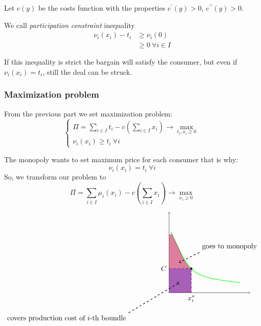 \documentclass[a4paper, 10pt]{article}
\begin{document}
Let $c(y)$ be the costs function with the properties $c^{\prime}(y)>0$, $c^{\prime \prime}(y)>0$.

We call \textit{participation constraint} inequality
$$
\begin{aligned}
    \nu_i\left(x_i\right)-t_i &\geqslant \nu_i(0)\\
    &\geqslant 0\ \forall i \in I
\end{aligned}
$$

If this inequality is strict the bargain will satisfy the consumer, but even if $\nu_i\left(x_i\right)=t_i$, still the deal can be struck.

\subsubsection{Maximization problem}
From the previous part we set maximization problem:
\begin{equation*}
    \begin{cases}
        \Pi=\sum_{i\in I}t_i-c\left(\sum_{i\in I} x_i\right)\longrightarrow\max_{t_i,x_i\geqslant0}\\
        \nu_i(x_i)\geqslant t_i\ \forall i
    \end{cases}
\end{equation*}

The monopoly wants to set maximum price for each consumer that is why:
\begin{equation*}
    \nu_i(x_i)=t_i\ \forall i
\end{equation*}
So, we transform our problem to
\begin{equation*}
    \Pi=\sum_{i\in I}\mu_i(x_i)-c\left(\sum_{i\in I} x_i\right)\longrightarrow\max_{x_i\geqslant0}
\end{equation*}

$$
\begin{tikzpicture}
    
    \draw[black, ->] (0,0) -- (0,4);
    \draw[black, ->] (0,0) -- (4,0);
    \draw[thick, green] (0.1,3) .. controls (1.1,0.8) .. (3.5,0.5);
    \draw[black, dashed] (1.1,0) node[black, below] {$x_i^*$} -- (1.1,1.2);
    \draw[black, dashed] (0,1.2) node[black, left] {$C$} -- (1.1,1.2);
    \fill[teal, black] (1.1,1.2) circle (1.5pt);
    \fill[purple, opacity=0.5] (0,0) -- (1.1,0) -- (1.1,1.2) -- (1,1.27) -- (0.95,1.34) -- (0.9, 1.41) --  (0.85, 1.48) --  (0.8, 1.55) --  (0.75, 1.65) --  (0.7, 1.73) -- (0.15,2.9) -- (0,2.9) -- (0,0) -- cycle;
    
    \fill[blue, opacity=0.25] (0,0) -- (1.1,0) -- (1.1,1.2) -- (0,1.2) -- (0,0) -- cycle;
    \draw[dashed, black, thick, ->] (1.5, 2) node[black, above right] {$\text{goes to monopoly}$} -- (0.5,1.5);
    \draw[dashed, black, thick, ->] (-2, -1) -- (0.5,0.5);
    \node[black, below left] at (-2, -1) {covers production cost of $i$-th boundle};
\end{tikzpicture}
$$
\end{document}
